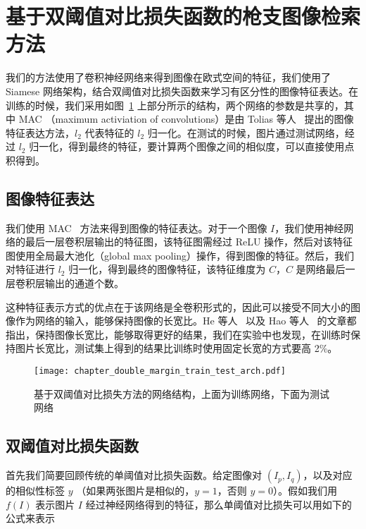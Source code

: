 \section{基于双阈值对比损失函数的枪支图像检索方法}\label{sec:double_margin_method}

我们的方法使用了卷积神经网络来得到图像在欧式空间的特征，我们使用了 Siamese 网络架构，结合双阈值对比损失函数来学习有区分性的图像特征表达。在训练的时候，我们采用如图~\ref{fig:train_test_arch} 上部分所示的结构，两个网络的参数是共享的，其中 MAC （maximum activiation of convolutions）是由 Tolias 等人~\cite{Tolias2015ParticularOR} 提出的图像特征表达方法，$l_2$ 代表特征的 $l_2$ 归一化。在测试的时候，图片通过测试网络，经过 $l_2$ 归一化，得到最终的特征，要计算两个图像之间的相似度，可以直接使用点积得到。

\subsection{图像特征表达}

我们使用 MAC~\cite{Tolias2015ParticularOR} 方法来得到图像的特征表达。对于一个图像 $I$，我们使用神经网络的最后一层卷积层输出的特征图，该特征图需经过 ReLU 操作，然后对该特征图使用全局最大池化（global max pooling）操作，得到图像的特征。然后，我们对特征进行 $l_2$ 归一化，得到最终的图像特征，该特征维度为 $C$，$C$ 是网络最后一层卷积层输出的通道个数。

这种特征表示方式的优点在于该网络是全卷积形式的，因此可以接受不同大小的图像作为网络的输入，能够保持图像的长宽比。He 等人~\cite{He2014SpatialPP} 以及 Hao 等人~\cite{Hao2017MFCAM} 的文章都指出，保持图像长宽比，能够取得更好的结果，我们在实验中也发现，在训练时保持图片长宽比，测试集上得到的结果比训练时使用固定长宽的方式要高 2\%。

\begin{figure}[!t]
  \centering
  \texttt{[image: chapter\_double\_margin\_train\_test\_arch.pdf]}
  \caption[基于双阈值对比损失方法的网络结构]{基于双阈值对比损失方法的网络结构，上面为训练网络，下面为测试网络}
  \label{fig:train_test_arch}
\end{figure}

\subsection{双阈值对比损失函数}
首先我们简要回顾传统的单阈值对比损失函数。给定图像对 $(I_p, I_q)$，以及对应的相似性标签 $y$ （如果两张图片是相似的，$y=1$，否则 $y=0$）。假如我们用 $f(I)$ 表示图片 $I$ 经过神经网络得到的特征，那么单阈值对比损失可以用如下的公式来表示

